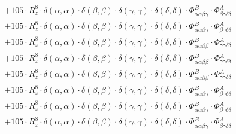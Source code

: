 \documentclass{article}
\begin{document}
\begin{subequations}
\begin{gather}
\begin{array}{c}
 \\[0.2em] 		 + 105 \cdot R_{z}^{8} \cdot \delta{}\left(\alpha{}, \alpha{}\right) \cdot \delta{}\left(\beta{}, \beta{}\right) \cdot \delta{}\left(\gamma{}, \gamma{}\right) \cdot \delta{}\left(\delta{}, \delta{}\right) \cdot \Phi{}^{B}_{\alpha{}\alpha{}\beta{}\gamma{}} \cdot \Phi{}^{A}_{\beta{}\gamma{}\delta{}\delta{}} 
 \\[0.2em] 		 + 105 \cdot R_{z}^{8} \cdot \delta{}\left(\alpha{}, \alpha{}\right) \cdot \delta{}\left(\beta{}, \beta{}\right) \cdot \delta{}\left(\gamma{}, \gamma{}\right) \cdot \delta{}\left(\delta{}, \delta{}\right) \cdot \Phi{}^{B}_{\alpha{}\alpha{}\beta{}\gamma{}} \cdot \Phi{}^{A}_{\beta{}\gamma{}\delta{}\delta{}} 
 \\[0.2em] 		 + 105 \cdot R_{z}^{8} \cdot \delta{}\left(\alpha{}, \alpha{}\right) \cdot \delta{}\left(\beta{}, \beta{}\right) \cdot \delta{}\left(\gamma{}, \gamma{}\right) \cdot \delta{}\left(\delta{}, \delta{}\right) \cdot \Phi{}^{B}_{\alpha{}\alpha{}\beta{}\beta{}} \cdot \Phi{}^{A}_{\gamma{}\gamma{}\delta{}\delta{}} 
 \\[0.2em] 		 + 105 \cdot R_{z}^{8} \cdot \delta{}\left(\alpha{}, \alpha{}\right) \cdot \delta{}\left(\beta{}, \beta{}\right) \cdot \delta{}\left(\gamma{}, \gamma{}\right) \cdot \delta{}\left(\delta{}, \delta{}\right) \cdot \Phi{}^{B}_{\alpha{}\alpha{}\beta{}\beta{}} \cdot \Phi{}^{A}_{\gamma{}\gamma{}\delta{}\delta{}} 
 \\[0.2em] 		 + 105 \cdot R_{z}^{8} \cdot \delta{}\left(\alpha{}, \alpha{}\right) \cdot \delta{}\left(\beta{}, \beta{}\right) \cdot \delta{}\left(\gamma{}, \gamma{}\right) \cdot \delta{}\left(\delta{}, \delta{}\right) \cdot \Phi{}^{B}_{\alpha{}\alpha{}\beta{}\beta{}} \cdot \Phi{}^{A}_{\gamma{}\gamma{}\delta{}\delta{}} 
 \\[0.2em] 		 + 105 \cdot R_{z}^{8} \cdot \delta{}\left(\alpha{}, \alpha{}\right) \cdot \delta{}\left(\beta{}, \beta{}\right) \cdot \delta{}\left(\gamma{}, \gamma{}\right) \cdot \delta{}\left(\delta{}, \delta{}\right) \cdot \Phi{}^{B}_{\alpha{}\alpha{}\beta{}\gamma{}} \cdot \Phi{}^{A}_{\beta{}\gamma{}\delta{}\delta{}} 
 \\[0.2em] 		 + 105 \cdot R_{z}^{8} \cdot \delta{}\left(\alpha{}, \alpha{}\right) \cdot \delta{}\left(\beta{}, \beta{}\right) \cdot \delta{}\left(\gamma{}, \gamma{}\right) \cdot \delta{}\left(\delta{}, \delta{}\right) \cdot \Phi{}^{B}_{\alpha{}\alpha{}\beta{}\gamma{}} \cdot \Phi{}^{A}_{\beta{}\gamma{}\delta{}\delta{}} 
 \\[0.2em] 		 + 105 \cdot R_{z}^{8} \cdot \delta{}\left(\alpha{}, \alpha{}\right) \cdot \delta{}\left(\beta{}, \beta{}\right) \cdot \delta{}\left(\gamma{}, \gamma{}\right) \cdot \delta{}\left(\delta{}, \delta{}\right) \cdot \Phi{}^{B}_{\alpha{}\alpha{}\beta{}\gamma{}} \cdot \Phi{}^{A}_{\beta{}\gamma{}\delta{}\delta{}} 

\end{array}
\end{gather}
\end{subequations}
\end{document}
